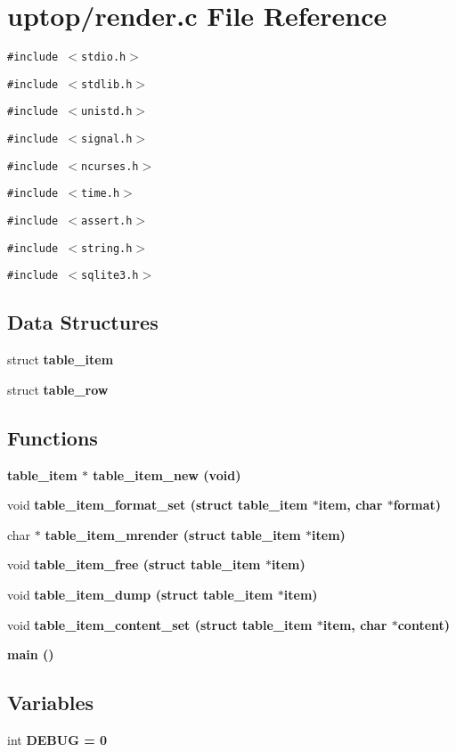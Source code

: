 \section{uptop/render.c File Reference}
\label{render_8c}
{\tt \#include $<$stdio.h$>$}\par
{\tt \#include $<$stdlib.h$>$}\par
{\tt \#include $<$unistd.h$>$}\par
{\tt \#include $<$signal.h$>$}\par
{\tt \#include $<$ncurses.h$>$}\par
{\tt \#include $<$time.h$>$}\par
{\tt \#include $<$assert.h$>$}\par
{\tt \#include $<$string.h$>$}\par
{\tt \#include $<$sqlite3.h$>$}\par
\subsection*{Data Structures}
\begin{CompactItemize}
\item 
struct \bf{table\_\-item}
\item 
struct \bf{table\_\-row}
\end{CompactItemize}
\subsection*{Functions}
\begin{CompactItemize}
\item 
\bf{table\_\-item} $\ast$ \bf{table\_\-item\_\-new} (void)
\item 
void \bf{table\_\-item\_\-format\_\-set} (struct \bf{table\_\-item} $\ast$item, char $\ast$format)
\item 
char $\ast$ \bf{table\_\-item\_\-mrender} (struct \bf{table\_\-item} $\ast$item)
\item 
void \bf{table\_\-item\_\-free} (struct \bf{table\_\-item} $\ast$item)
\item 
void \bf{table\_\-item\_\-dump} (struct \bf{table\_\-item} $\ast$item)
\item 
void \bf{table\_\-item\_\-content\_\-set} (struct \bf{table\_\-item} $\ast$item, char $\ast$content)
\item 
\bf{main} ()
\end{CompactItemize}
\subsection*{Variables}
\begin{CompactItemize}
\item 
int \bf{DEBUG} = 0
\end{CompactItemize}


